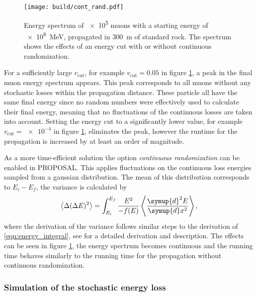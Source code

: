 \begin{figure}
    \centering
    \texttt{[image: build/cont\_rand.pdf]}
    \caption[]{Energy spectrum of \num{e5} muons with a starting energy of \SI{e8}{\mega\electronvolt}, propagated in \SI{300}{\meter} of standard rock\footnotemark. The spectrum shows the effects of an energy cut with or without continuous randomization.}
    \label{fig:cont_rand}
\end{figure}
For a sufficiently large $v_\text{cut}$, for example $v_\text{cut} = 0.05$ in figure \ref{fig:cont_rand}, a peak in the final muon energy spectrum appears.
This peak corresponds to all muons without any stochastic losses within the propagation distance.
These particle all have the same final energy since no random numbers were effectively used to calculate their final energy, meaning that no fluctuations of the continuous losses are taken into account.
Setting the energy cut to a significantly lower value, for example $v_\text{cut} = \num{e-4}$ in figure \ref{fig:cont_rand}, eliminates the peak, however the runtime for the propagation is increased by at least an order of magnitude.

As a more time-efficient solution the option \emph{continuous randomization} can be enabled in PROPOSAL.
This applies fluctuations on the continuous loss energies sampled from a gaussian distribution.
The mean of this distribution corresponds to $E_i - E_f$, the variance is calculated by
%
\begin{equation}
	\left< \Delta (\Delta E)^2 \right> = \int_{E_i}^{E_f} \frac{E^2}{-f(E)} \left< \frac{\symup{d}^2E}{\symup{d}x^2} \right>,
\end{equation}
%
where the derivation of the variance follows similar steps to the derivation of \eqref{eqn:energy_integral}, see \cite{chirkin2004propagating} for a detailed derivation and description. 
The effects can be seen in figure \ref{fig:cont_rand}, the energy spectrum becomes continuous and the running time behaves similarly to the running time for the propagation without continuous randomization.

\subsubsection{Simulation of the stochastic energy loss}

